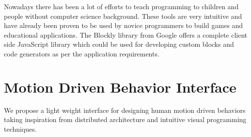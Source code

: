 \documentclass{llncs}
\begin{document}
	Nowadays there has been a lot of efforts to teach programming to children and people without computer science background\cite{Scratch}\cite{Blockly}. These tools are very intuitive and have already been proven to be used by novice programmers to build games and educational applications. The Blockly library\cite{Blockly} from Google offers a complete client side JavaScript library which could be used for developing custom blocks and code generators as per the application requirements.
\section{Motion Driven Behavior Interface}
%
We propose a light weight interface for designing human motion driven behaviors taking inspiration from distributed architecture\cite{quigley2009ros} and intuitive visual programming techniques\cite{Blockly}. 
%
\end{document}
